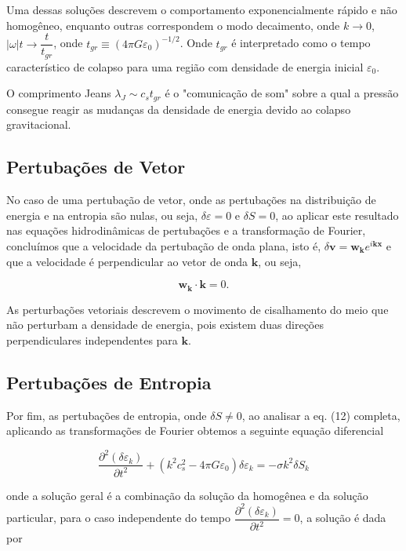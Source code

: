 Uma dessas soluções descrevem o comportamento exponencialmente rápido e não homogêneo, enquanto outras correspondem o modo decaimento, onde $k \to 0$, $|\omega | t \to \dfrac{t}{t_{gr}}$, onde $t_{gr} \equiv (4\pi G\varepsilon_0)^{-1/2}$. Onde $t_{gr}$ é interpretado como o tempo característico de colapso para uma região com densidade de energia inicial $\varepsilon_0$.

O comprimento Jeans $\lambda_J \sim c_s t_{gr} $ é o "comunicação de som" sobre a qual a pressão consegue reagir as mudanças da densidade de energia devido ao colapso gravitacional.


\subsection*{Pertubações de Vetor}
No caso de uma pertubação de vetor, onde as pertubações na distribuição de energia e na entropia são nulas, ou seja, $ \delta\varepsilon = 0 $ e $ \delta S = 0$, ao aplicar este resultado nas equações hidrodinâmicas de pertubações e a transformação de Fourier, concluímos que a velocidade da pertubação de onda plana, isto é, $\delta\mathbf{v} = \mathbf{w_k} e^{i\mathbf{k}\mathbf{x}}$ e que a velocidade é perpendicular ao vetor de onda $\mathbf{k}$, ou seja,

\begin{equation}\label{eq17}
	\mathbf{w_k} \cdot \mathbf{k} = 0.
\end{equation}

 As perturbações vetoriais descrevem o movimento de cisalhamento do meio que não perturbam a densidade de energia, pois existem duas direções perpendiculares independentes para $\mathbf{k}$.
 
 \subsection*{Pertubações de Entropia}
 
 Por fim, as pertubações de entropia, onde $ \delta S \neq 0$, ao analisar a eq. (12) completa, aplicando as transformações de Fourier obtemos a seguinte equação diferencial 
 
\begin{equation}\label{eq18}
 	\dfrac{\partial^2 (\delta\varepsilon_k )}{\partial t^2} +(k^2c^2_s - 4\pi G\varepsilon_0)\delta\varepsilon_k  = -\sigma k^2 \delta S_k
\end{equation} 
 
 onde a solução geral é a combinação da solução da homogênea e da solução particular, para o caso independente do tempo $  \dfrac{\partial^2 (\delta\varepsilon_k )}{\partial t^2}  = 0 $, a solução é dada por 
 
